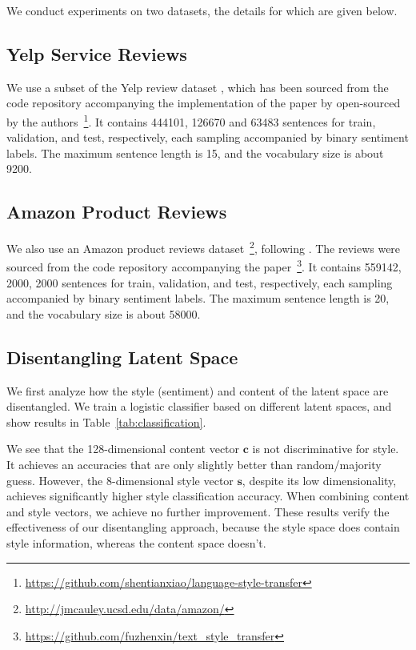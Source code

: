 \documentclass[11pt,a4paper]{article}
\begin{document}
We conduct experiments on two datasets, the details for which are given below.

\subsection{Yelp Service Reviews}

We use a subset of the Yelp review dataset \citep{challenge2013yelp}, which has been sourced from the code repository accompanying the implementation of the paper by \cite{shen2017style} open-sourced by the authors~\footnote{\url{https://github.com/shentianxiao/language-style-transfer}}. It contains 444101, 126670 and 63483 sentences for train, validation, and test, respectively, each sampling accompanied by binary sentiment labels. The maximum sentence length is 15, and the vocabulary size is about 9200.

\subsection{Amazon Product Reviews}

We also use an Amazon product reviews dataset~\footnote{\url{http://jmcauley.ucsd.edu/data/amazon/}}, following \cite{fu2017style}. The reviews were sourced from the code repository accompanying the paper~\footnote{\url{https://github.com/fuzhenxin/text_style_transfer}}. It contains 559142, 2000, 2000 sentences for train, validation, and test, respectively, each sampling accompanied by binary sentiment labels. The maximum sentence length is 20, and the vocabulary size is about 58000.

\subsection{Disentangling Latent Space}


We first analyze how the style (sentiment) and content of the latent space are disentangled. We train a logistic classifier based on different latent spaces, and show results in Table~\ref{tab:classification}.

We see that the 128-dimensional content vector $\bm c$ is not discriminative for style. It achieves an accuracies that are only slightly better than random/majority guess. However, the 8-dimensional style vector $\bm s$, despite its low dimensionality, achieves significantly higher style classification accuracy. When combining content and style vectors, we achieve no further improvement. These results verify the effectiveness of our disentangling approach, because the style space does contain style information, whereas the content space doesn't.
\end{document}
